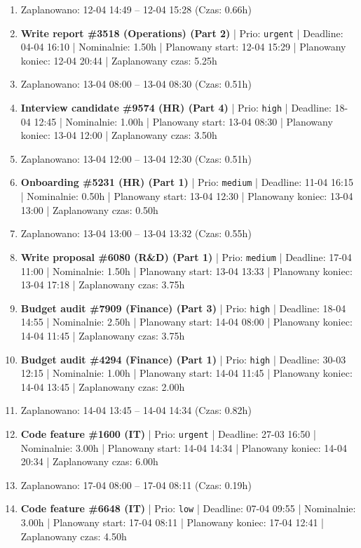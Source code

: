 {\begin{enumerate}
  \item [\textbf{PRZERWA}] Zaplanowano: 12-04 14:49 -- 12-04 15:28 (Czas: 0.66h)
  \item [\textbf{14598}] \textbf{Write report \#3518 (Operations) (Part 2)} | Prio: \texttt{urgent} | Deadline: 04-04 16:10 | Nominalnie: 1.50h | Planowany start: 12-04 15:29 | Planowany koniec: 12-04 20:44 | Zaplanowany czas: 5.25h
  \item [\textbf{PRZERWA}] Zaplanowano: 13-04 08:00 -- 13-04 08:30 (Czas: 0.51h)
  \item [\textbf{14612}] \textbf{Interview candidate \#9574 (HR) (Part 4)} | Prio: \texttt{high} | Deadline: 18-04 12:45 | Nominalnie: 1.00h | Planowany start: 13-04 08:30 | Planowany koniec: 13-04 12:00 | Zaplanowany czas: 3.50h
  \item [\textbf{PRZERWA}] Zaplanowano: 13-04 12:00 -- 13-04 12:30 (Czas: 0.51h)
  \item [\textbf{14671}] \textbf{Onboarding \#5231 (HR) (Part 1)} | Prio: \texttt{medium} | Deadline: 11-04 16:15 | Nominalnie: 0.50h | Planowany start: 13-04 12:30 | Planowany koniec: 13-04 13:00 | Zaplanowany czas: 0.50h
  \item [\textbf{PRZERWA}] Zaplanowano: 13-04 13:00 -- 13-04 13:32 (Czas: 0.55h)
  \item [\textbf{14669}] \textbf{Write proposal \#6080 (R\&D) (Part 1)} | Prio: \texttt{medium} | Deadline: 17-04 11:00 | Nominalnie: 1.50h | Planowany start: 13-04 13:33 | Planowany koniec: 13-04 17:18 | Zaplanowany czas: 3.75h
  \item [\textbf{14616}] \textbf{Budget audit \#7909 (Finance) (Part 3)} | Prio: \texttt{high} | Deadline: 18-04 14:55 | Nominalnie: 2.50h | Planowany start: 14-04 08:00 | Planowany koniec: 14-04 11:45 | Zaplanowany czas: 3.75h
  \item [\textbf{14619}] \textbf{Budget audit \#4294 (Finance) (Part 1)} | Prio: \texttt{high} | Deadline: 30-03 12:15 | Nominalnie: 1.00h | Planowany start: 14-04 11:45 | Planowany koniec: 14-04 13:45 | Zaplanowany czas: 2.00h
  \item [\textbf{PRZERWA}] Zaplanowano: 14-04 13:45 -- 14-04 14:34 (Czas: 0.82h)
  \item [\textbf{14605}] \textbf{Code feature \#1600 (IT)} | Prio: \texttt{urgent} | Deadline: 27-03 16:50 | Nominalnie: 3.00h | Planowany start: 14-04 14:34 | Planowany koniec: 14-04 20:34 | Zaplanowany czas: 6.00h
  \item [\textbf{PRZERWA}] Zaplanowano: 17-04 08:00 -- 17-04 08:11 (Czas: 0.19h)
  \item [\textbf{14683}] \textbf{Code feature \#6648 (IT)} | Prio: \texttt{low} | Deadline: 07-04 09:55 | Nominalnie: 3.00h | Planowany start: 17-04 08:11 | Planowany koniec: 17-04 12:41 | Zaplanowany czas: 4.50h

\end{enumerate}}

